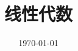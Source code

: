 \documentclass[a4paper,12pt]{article}
\begin{document}
    \title{线性代数}
    \date{\today}
    \maketitle
    \renewcommand{\contentsname}{}
    \tableofcontents
    \newpage

    

    \newpage
    

    \newpage
    

    \newpage
    

    \newpage
    

    \newpage
    
\end{document}

